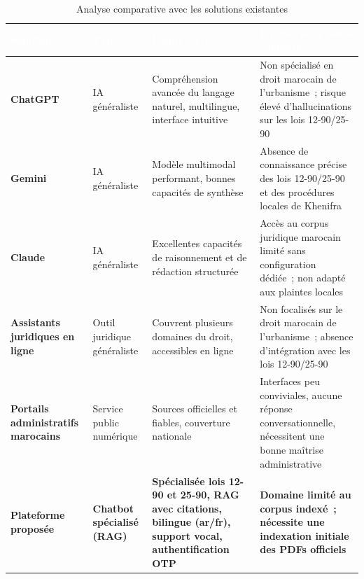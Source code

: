 \documentclass[12pt,a4paper]{report}
\begin{document}
\begin{table}[H]
\centering
\caption{Analyse comparative avec les solutions existantes}
\label{tab:existant}
\renewcommand{\arraystretch}{1.45}
\begin{tabularx}{\linewidth}{%
  >{\columncolor{tablerowodd}\bfseries\small}p{2.5cm}
  >{\columncolor{tablerowodd}\small}p{2.3cm}
  >{\columncolor{tablerowodd}\small}X
  >{\columncolor{tablerowodd}\small}X
}
\arrayrulecolor{darkblue}
\hline
\rowcolor{tableheader}
\textcolor{white}{\textbf{Solution}} &
\textcolor{white}{\textbf{Type}} &
\textcolor{white}{\textbf{Points forts}} &
\textcolor{white}{\textbf{Limites pour notre contexte}} \\
\hline
\rowcolor{tableroweven}
ChatGPT &
IA généraliste &
Compréhension avancée du langage naturel, multilingue, interface intuitive &
Non spécialisé en droit marocain de l'urbanisme~; risque élevé d'hallucinations sur les lois 12-90/25-90 \\
\hline
\rowcolor{tablerowodd}
Gemini &
IA généraliste &
Modèle multimodal performant, bonnes capacités de synthèse &
Absence de connaissance précise des lois 12-90/25-90 et des procédures locales de Khenifra \\
\hline
\rowcolor{tableroweven}
Claude &
IA généraliste &
Excellentes capacités de raisonnement et de rédaction structurée &
Accès au corpus juridique marocain limité sans configuration dédiée~; non adapté aux plaintes locales \\
\hline
\rowcolor{tablerowodd}
Assistants juridiques en ligne &
Outil juridique généraliste &
Couvrent plusieurs domaines du droit, accessibles en ligne &
Non focalisés sur le droit marocain de l'urbanisme~; absence d'intégration avec les lois 12-90/25-90 \\
\hline
\rowcolor{tableroweven}
Portails administratifs marocains &
Service public numérique &
Sources officielles et fiables, couverture nationale &
Interfaces peu conviviales, aucune réponse conversationnelle, nécessitent une bonne maîtrise administrative \\
\hline
\rowcolor{tablerowgreen}
\textbf{Plateforme proposée} &
\textbf{Chatbot spécialisé (RAG)} &
\textbf{Spécialisée lois 12-90 et 25-90, RAG avec citations, bilingue (ar/fr), support vocal, authentification OTP} &
\textbf{Domaine limité au corpus indexé~; nécessite une indexation initiale des PDFs officiels} \\
\hline
\end{tabularx}
\end{table}
\end{document}
